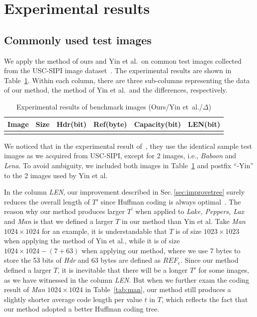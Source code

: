 

\section{Experimental results}
\label{sec:experimental}

\subsection{Commonly used test images}

We apply the method of ours and Yin et al.\ on common test images collected from the USC-SIPI image dataset~\cite{UniversityofSouthernCalifornia2020}.
The experimental results are shown in Table~\ref{tab:common}. 
Within each column, there are three sub-columns representing the data of our method, the method of Yin et al.\ and the differences, respectively.

\begin{table}
	\scriptsize
	\centering
	\caption{Experimental results of benchmark images (Ours/Yin et~al./$\Delta$)}
	\label{tab:common}
	\begin{tabular}{l@{}c  @{\quad}  r@{/}r@{/}r  @{\quad} r@{/}r@{/}r  @{\quad} r@{/}r@{/}r  @{\quad} r@{/}r@{/}r }
		\toprule
		\multicolumn{1}{c}{Image} & Size & 
		\multicolumn{3}{c}{Hdr(bit)}            & \multicolumn{3}{c}{Ref(byte)}& \multicolumn{3}{c}{Capacity(bit)}& \multicolumn{3}{c}{LEN(bit)}      \\ 
		\midrule
		\deltatablesample
		\bottomrule
	\end{tabular}
\end{table}

We noticed that in the experimental result of~\cite{Yin2020}, they use the identical sample test images as we acquired from USC-SIPI, except for 2 images, i.e., \emph{Baboon} and \emph{Lena}. 
To avoid ambiguity, we included both images in Table~\ref{tab:common} and postfix ``-Yin'' to the 2 images used by Yin et al.

In the column \emph{LEN}, our improvement described in Sec.\,\ref{sec:improvetree} surely reduces the overall length of $T'$ since Huffman coding is always optimal~\cite{Long2001}.
%
The reason why our method produces larger $T^\prime$ when applied to \emph{Lake, Peppers, Lax} and \emph{Man} is that we defined a larger $T$ in our method than Yin et al.
%
Take \emph{Man} $1024 \times 1024$ for an example, 
it is understandable that $T$ is of size $1023 \times 1023$ when applying the method of Yin et al., 
while it is of size $1024 \times 1024 - (7 + 63)$ when applying our method, 
where we use 7 bytes to store the 53 bits of \emph{Hdr} and 63 bytes are defined as $REF_e$.
%
Since our method defined a larger $T$, it is inevitable that there will be a longer $T'$ for some images, as we have witnessed in the column \emph{LEN}. 
%
But when we further exam the coding result of \emph{Man} $1024 \times 1024$ in Table~\ref{tab:man}, our method still produces a slightly shorter average code length per value $t$ in $T$, which reflects the fact that our method adopted a better Huffman coding tree.

